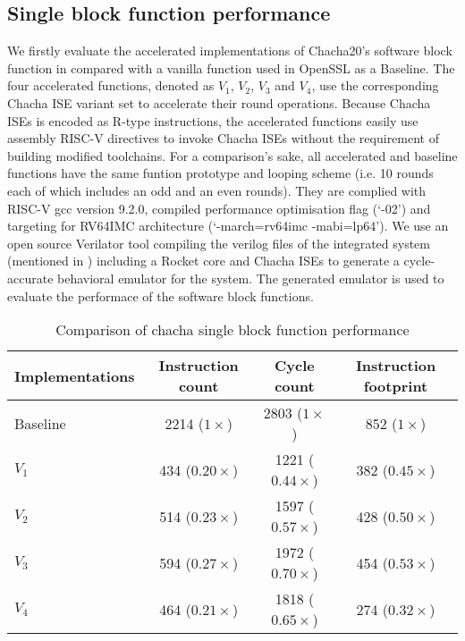 
\subsection{Single block function performance}
\label{sec:eval:blk}
We firstly evaluate the accelerated implementations of Chacha20's software block function in compared with a vanilla function used in OpenSSL as a Baseline. The four accelerated functions, denoted as $V_1$, $V_2$, $V_3$ and $V_4$, use the corresponding Chacha ISE variant set to accelerate their round operations. 
Because Chacha ISEs is encoded as R-type instructions, the accelerated functions easily use assembly RISC-V directives  to invoke Chacha ISEs without the requirement of building modified toolchains.   
For a comparison's sake, all accelerated and baseline functions have the same funtion prototype and looping scheme (i.e. 10 rounds each of which includes an odd and an even rounds). 
They are complied with RISC-V gcc version 9.2.0, compiled performance optimisation flag (`-02') and targeting for RV64IMC architecture (`-march=rv64imc -mabi=lp64'). 
We use an open source Verilator tool compiling the verilog files of the integrated system (mentioned in ) including a Rocket core and Chacha ISEs to generate a cycle-accurate behavioral emulator for the system. The generated emulator is used to evaluate the performace of the software block functions.  

\begin{table}
\caption{Comparison of chacha single block function performance}
\label{tab:res:sw:perf1}
\begin{tabular}{lccc}
\toprule            
Implementations        & Instruction count   & Cycle count & Instruction footprint\\

\midrule
Baseline     & 2214 ($1\times$)  & 2803 ($1\times$)    &  852 ($1\times$)  \\
 $V_1$ &  434 ($0.20\times$)     & 1221 ($0.44\times$) &  382 ($0.45\times$) \\
 $V_2$ &  514 ($0.23\times$)     & 1597 ($0.57\times$) &  428 ($0.50\times$)\\
 $V_3$ &  594 ($0.27\times$)     & 1972 ($0.70\times$) &  454 ($0.53\times$)\\
 $V_4$ &  464 ($0.21\times$)     & 1818 ($0.65\times$) &  274 ($0.32\times$)\\

\bottomrule
\end{tabular}
\end{table}


